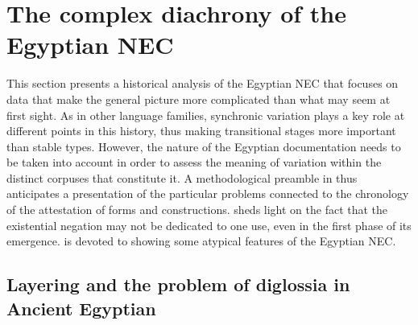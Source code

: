 \documentclass[output=paper]{langsci/langscibook}
\newcommand{\ꜥ}{ʿ}
\newcommand{\ꜣ}{\kern-.25pt\texttt{ꜣ}\kern-.6pt}
\begin{document}
\section{The complex diachrony of the Egyptian NEC}\label{s:AE3}

This section presents a historical analysis of the Egyptian NEC that focuses on data that make the general picture more complicated than what may seem at first sight. As in other language families, synchronic variation plays a key role at different points in this history, thus making transitional stages more important than stable types. However, the nature of the Egyptian documentation needs to be taken into account in order to assess the meaning of variation within the distinct corpuses that constitute it. A methodological preamble in  thus anticipates a presentation of the particular problems connected to the chronology of the attestation of forms and constructions.  sheds light on the fact that the existential negation may not be dedicated to one use, even in the first phase of its emergence.  is devoted to showing some atypical features of the Egyptian NEC.

\subsection{Layering and the problem of diglossia in Ancient Egyptian}\label{s:AE3-1}
\end{document}
